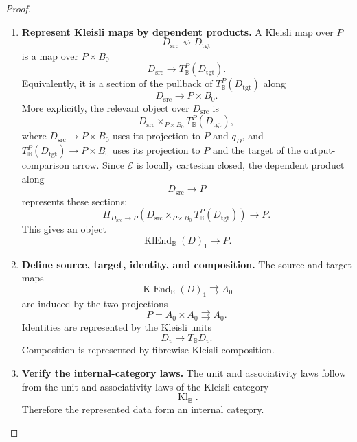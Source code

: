 \begin{proof}
\begin{enumerate}
        The defining pullback is
        \[
        \begin{tikzcd}[column sep=large, row sep=large]
            T_{\mathbb B}^{P}(D_{\mathrm{tgt}})
                \arrow[r, "\pi_{B_1}"]
                \arrow[d, "\pi_{D_{\mathrm{tgt}}}"']
                \arrow[dr, phantom, "\lrcorner", very near start]
            &
            B_1
                \arrow[d, "s_B"]
            \\
            D_{\mathrm{tgt}}
                \arrow[r, "q_D"']
            &
            B_0 .
        \end{tikzcd}
        \]

        \item \textbf{Represent Kleisli maps by dependent products.}
        A Kleisli map over \(P\)
        \[
            D_{\mathrm{src}}\rightsquigarrow D_{\mathrm{tgt}}
        \]
        is a map over \(P\times B_0\)
        \[
            D_{\mathrm{src}}\to T_{\mathbb B}^{P}(D_{\mathrm{tgt}}).
        \]
        Equivalently, it is a section of the pullback of
        \(T_{\mathbb B}^{P}(D_{\mathrm{tgt}})\) along
        \[
            D_{\mathrm{src}}\to P\times B_0.
        \]
        More explicitly, the relevant object over \(D_{\mathrm{src}}\) is
        \[
            D_{\mathrm{src}}
            \times_{P\times B_0}
            T_{\mathbb B}^{P}(D_{\mathrm{tgt}}),
        \]
        where \(D_{\mathrm{src}}\to P\times B_0\) uses its projection to \(P\)
        and \(q_D\), and
        \(T_{\mathbb B}^{P}(D_{\mathrm{tgt}})\to P\times B_0\) uses its
        projection to \(P\) and the target of the output-comparison arrow.
        Since \(\mathcal E\) is locally cartesian closed, the dependent product
        along
        \[
            D_{\mathrm{src}}\to P
        \]
        represents these sections:
        \[
            \Pi_{D_{\mathrm{src}}\to P}
            \left(
                D_{\mathrm{src}}
                \times_{P\times B_0}
                T_{\mathbb B}^{P}(D_{\mathrm{tgt}})
            \right)
            \to P.
        \]
        This gives an object
        \[
            \operatorname{KlEnd}_{\mathbb B}(D)_1\to P.
        \]

        \item \textbf{Define source, target, identity, and composition.}
        The source and target maps
        \[
            \operatorname{KlEnd}_{\mathbb B}(D)_1\rightrightarrows A_0
        \]
        are induced by the two projections
        \[
            P=A_0\times A_0\rightrightarrows A_0.
        \]
        Identities are represented by the Kleisli units
        \[
            D_v\to T_{\mathbb B}D_v.
        \]
        Composition is represented by fibrewise Kleisli composition.

        \item \textbf{Verify the internal-category laws.}
        The unit and associativity laws follow from the unit and associativity
        laws of the Kleisli category
        \[
            \operatorname{Kl}_{\mathbb B}.
        \]
        Therefore the represented data form an internal category.
    \end{enumerate}
\end{proof}

